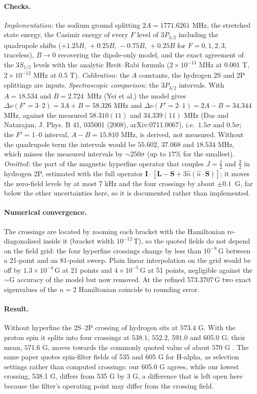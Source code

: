 \paragraph{Checks.} \emph{Implementation:} the sodium ground splitting $2A=1771.6261$ MHz, the stretched state energy, the Casimir energy of every $F$ level of $3P_{3/2}$ including the quadrupole shifts ($+1.25B,\,+0.25B,\,-0.75B,\,+0.25B$ for $F=0,1,2,3$, traceless), $B\to0$ recovering the dipole-only model, and the exact agreement of the $3S_{1/2}$ levels with the analytic Breit--Rabi formula ($2\times10^{-13}$ MHz at 0.001 T, $2\times10^{-12}$ MHz at 0.5 T). \emph{Calibration:} the $A$ constants, the hydrogen 2S and 2P splittings are inputs. \emph{Spectroscopic comparison:} the $3P_{3/2}$ intervals. With $A=18.534$ and $B=2.724$~MHz (Yei et al.) the model gives $\Delta\nu(F'=3\text{--}2)=3A+B=58.326$ MHz and $\Delta\nu(F'=2\text{--}1)=2A-B=34.344$ MHz, against the measured $58.310(11)$ and $34.339(11)$ MHz (Das and Natarajan, J. Phys. B 41, 035001 (2008), arXiv:0711.0067), i.e.\ $1.5\sigma$ and $0.5\sigma$; the $F'=1\text{--}0$ interval, $A-B=15.810$ MHz, is derived, not measured. Without the quadrupole term the intervals would be $55.602$, $37.068$ and $18.534$ MHz, which misses the measured intervals by $\sim250\sigma$ (up to $17\%$ for the smallest). \emph{Omitted:} the part of the magnetic hyperfine operator that couples $J=\tfrac12$ and $\tfrac32$ in hydrogen 2P, estimated with the full operator $\mathbf I\cdot[\mathbf L-\mathbf S+3\hat n(\hat n\cdot\mathbf S)]$; it moves the zero-field levels by at most 7 kHz and the four crossings by about $\pm0.1$~G, far below the other uncertainties here, so it is documented rather than implemented.

\paragraph{Numerical convergence.} The crossings are located by zooming each bracket with the Hamiltonian re-diagonalised inside it (bracket width $10^{-12}$\,T), so the quoted fields do not depend on the field grid: the four hyperfine crossings change by less than $10^{-8}$\,G between a 21-point and an 81-point sweep. Plain linear interpolation on the grid would be off by $1.3\times10^{-4}$\,G at 21 points and $4\times10^{-5}$\,G at 51 points, negligible against the $\sim$G accuracy of the model but now removed. At the refined 573.3707\,G two exact eigenvalues of the $n=2$ Hamiltonian coincide to rounding error.

\paragraph{Result.} Without hyperfine the 2S--2P crossing of hydrogen sits at $573.4$ G. With the proton spin it splits into four crossings at $538.1$, $552.2$, $591.0$ and $605.0$ G; their mean, $571.6$ G, moves towards the commonly quoted value of about $570$ G
\cite{westig}. The same paper quotes spin-filter fields of 535 and 605 G for H-alpha, as selection settings rather than computed crossings: our 605.0 G agrees, while our lowest crossing, 538.1 G, differs from 535 G by 3 G, a difference that is left open here because the filter's operating point may differ from the crossing field.

